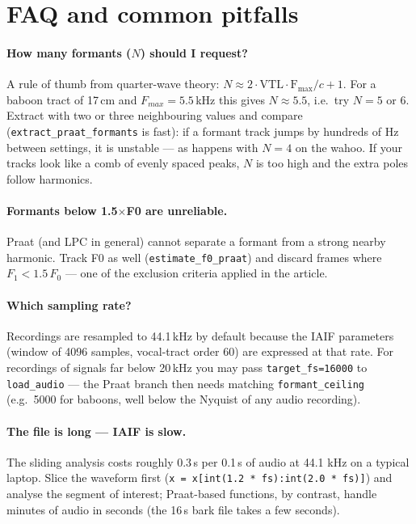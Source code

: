 \documentclass[11pt,a4paper]{article}
\begin{document}
\section{FAQ and common pitfalls}

\paragraph{How many formants ($N$) should I request?}
A rule of thumb from quarter-wave theory: $N \approx 2 \cdot
\mathrm{VTL} \cdot \mathrm{F_{max}} / c + 1$. For a baboon tract of
17\,cm and $F_{max} = 5.5$\,kHz this gives $N \approx 5.5$, i.e.\ try
$N=5$ or 6. Extract with two or three neighbouring values and compare
(\texttt{extract\_praat\_formants} is fast): if a formant track jumps by
hundreds of Hz between settings, it is unstable --- as happens with
$N=4$ on the wahoo. If your tracks look like a comb of evenly spaced
peaks, $N$ is too high and the extra poles follow harmonics.

\paragraph{Formants below 1.5$\times$F0 are unreliable.}
Praat (and LPC in general) cannot separate a formant from a strong
nearby harmonic. Track F0 as well (\texttt{estimate\_f0\_praat}) and
discard frames where $F_1 < 1.5\,F_0$ --- one of the exclusion criteria
applied in the article.

\paragraph{Which sampling rate?}
Recordings are resampled to 44.1\,kHz by default because the IAIF
parameters (window of 4096 samples, vocal-tract order 60) are expressed
at that rate. For recordings of signals far below 20\,kHz you may pass
\texttt{target\_fs=16000} to \texttt{load\_audio} --- the Praat branch
then needs matching \texttt{formant\_ceiling} (e.g.\ 5000 for baboons,
well below the Nyquist of any audio recording).

\paragraph{The file is long --- IAIF is slow.}
The sliding analysis costs roughly 0.3\,s per 0.1\,s of audio at 44.1
kHz on a typical laptop. Slice the waveform first
(\texttt{x = x[int(1.2 * fs):int(2.0 * fs)]}) and analyse the segment
of interest; Praat-based functions, by contrast, handle minutes of
audio in seconds (the 16\,s bark file takes a few seconds).
\end{document}
